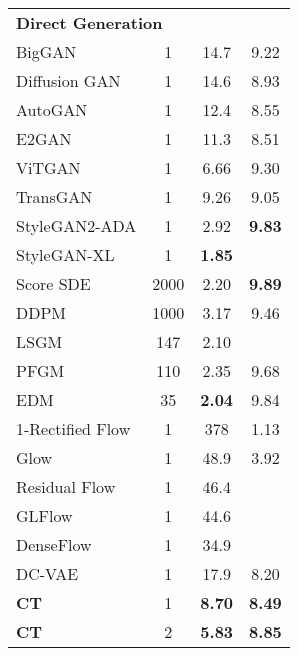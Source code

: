 \begin{table*}
\begin{minipage}[t]{0.49\linewidth}
{\begin{adjustbox}{max width=\linewidth}
\begin{tabular}{lccc}
        \\[-3ex]
        \multicolumn{4}{l}{\textbf{Direct Generation}}\\\Xhline{3\arrayrulewidth}
        BigGAN \cite{brock2018large} & 1 & 14.7 & 9.22\\
         Diffusion GAN \cite{xiao2022tackling} & 1 & 14.6 & 8.93\\
         AutoGAN \cite{gong2019autogan} & 1 & 12.4 & 8.55\\
         E2GAN \cite{tian2020off} & 1 & 11.3 & 8.51\\
        ViTGAN \cite{lee2021vitgan}
         & 1 & 6.66 & 9.30 \\
         TransGAN \cite{jiang2021transgan} & 1 & 9.26 & 9.05 \\
        StyleGAN2-ADA \cite{karras2020analyzing}
         & 1 & 2.92 & \textbf{9.83}\\
        StyleGAN-XL \cite{sauer2022stylegan} & 1 & \textbf{1.85} & \\
        \hline
        Score SDE \cite{song2021scorebased} & 2000 & 2.20 & \textbf{9.89}\\
        DDPM \cite{ho2020denoising} & 1000 & 3.17 & 9.46\\
        LSGM \cite{vahdat2021score} & 147 & 2.10 & \\
        PFGM \cite{xu2022poisson} & 110 & 2.35 & 9.68\\
        EDM \cite{karras2022edm}
         & 35 & \textbf{2.04} & 9.84 \\
         \hline
        1-Rectified Flow \cite{liu2022flow}
         & 1 & 378 & 1.13\\
        Glow \cite{kingma2018glow}
         & 1 & 48.9 & 3.92 \\
        Residual Flow \cite{chen2019residual} & 1 & 46.4\\
        GLFlow \cite{xiao2019generative} & 1 & 44.6 & \\
        DenseFlow \cite{grcic2021densely} & 1 & 34.9 & \\
        DC-VAE \cite{parmar2021dual} & 1 & 17.9 & 8.20 \\
        \textbf{CT} & 1 & \textbf{8.70} & \textbf{8.49} \\
        \hline
        \textbf{CT}  & 2 & \textbf{5.83} & \textbf{8.85} \\
	\end{tabular}
    \end{adjustbox}
	}
\end{minipage}
\hfill
\begin{minipage}[t]{0.49\linewidth}

\end{minipage}
\end{table*}
